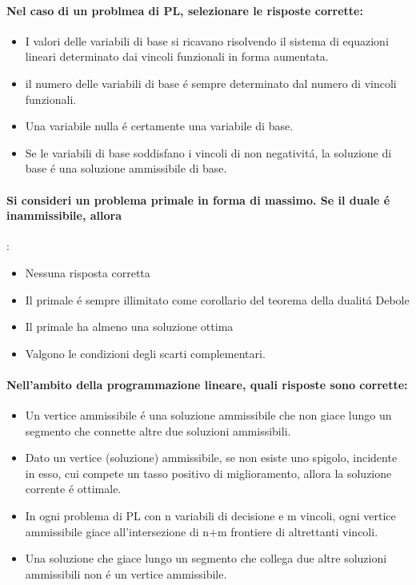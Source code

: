 \documentclass[12pt, a4paper, openany]{book}
\begin{document}
\paragraph{Nel caso di un problmea di PL, selezionare le risposte corrette:}
\begin{itemize}
    \item I valori delle variabili di base si ricavano risolvendo il sistema di equazioni lineari determinato dai vincoli funzionali in forma aumentata.
    \item il numero delle variabili di base é sempre determinato dal numero di vincoli funzionali.
    \item Una variabile nulla é certamente una variabile di base.
    \item Se le variabili di base soddisfano i vincoli di non negativitá, la soluzione di base é una soluzione ammissibile di base.
\end{itemize}
\paragraph{Si consideri un problema primale in forma di massimo. Se il duale é inammissibile, allora}:
\begin{itemize}
    \item Nessuna risposta corretta
    \item Il primale é sempre illimitato come corollario del teorema della dualitá Debole
    \item Il primale ha almeno una soluzione ottima
    \item Valgono le condizioni degli scarti complementari.
\end{itemize}

\paragraph{Nell'ambito della programmazione lineare, quali risposte sono corrette:}
\begin{itemize}
    \item Un vertice ammissibile é una soluzione ammissibile che non giace lungo un segmento che connette altre due soluzioni ammissibili.
    \item Dato un vertice (soluzione) ammissibile, se non esiste uno spigolo, incidente in esso, cui compete un tasso positivo di miglioramento, allora la soluzione corrente é ottimale.
    \item In ogni problema di PL con n variabili di decisione e m vincoli, ogni vertice ammissibile giace all'intersezione di n+m frontiere di altrettanti vincoli.
    \item Una soluzione che giace lungo un segmento che collega due altre soluzioni ammissibili non é un vertice ammissibile.
\end{itemize}
\end{document}
